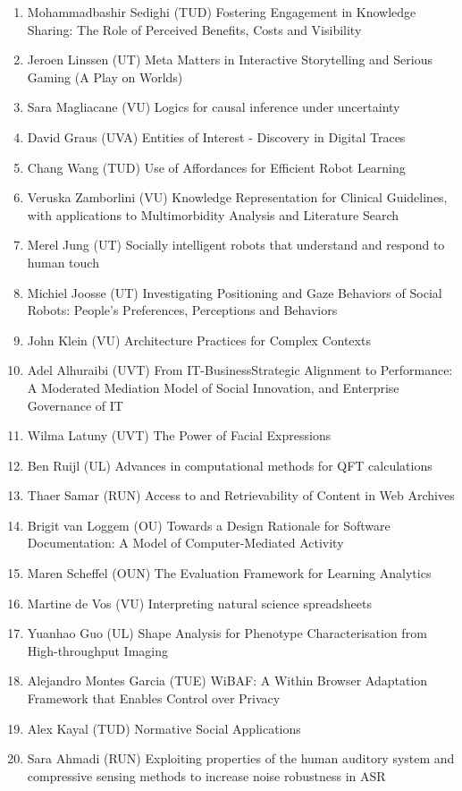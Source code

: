 \begin{multicols}{2}
\begin{scriptsize}
\begin{enumerate}[leftmargin=*,noitemsep,topsep=0pt,parsep=1pt,partopsep=0pt]
\item Mohammadbashir Sedighi (TUD) Fostering Engagement in Knowledge Sharing: The Role of Perceived Benefits, Costs and Visibility
\item Jeroen Linssen (UT) Meta Matters in Interactive Storytelling and Serious Gaming (A Play on Worlds)
\item Sara Magliacane (VU) Logics for causal inference under uncertainty 
\item David Graus (UVA) Entities of Interest - Discovery in Digital Traces
\item Chang Wang (TUD) Use of Affordances for Efficient Robot Learning
\item Veruska Zamborlini (VU) Knowledge Representation for Clinical Guidelines, with applications to Multimorbidity Analysis and Literature Search
\item Merel Jung (UT) Socially intelligent robots that understand and respond to human touch	
\item Michiel Joosse (UT) Investigating Positioning and Gaze Behaviors of Social Robots: People's Preferences, Perceptions and Behaviors
\item John Klein (VU) Architecture Practices for Complex Contexts
\item Adel Alhuraibi (UVT) From IT-BusinessStrategic Alignment to Performance: A Moderated Mediation Model of Social Innovation, and Enterprise Governance of IT
\item Wilma Latuny (UVT) The Power of Facial Expressions
\item Ben Ruijl (UL) Advances in computational methods for QFT calculations
\item Thaer Samar (RUN) Access to and Retrievability of Content in Web Archives
\item Brigit van Loggem (OU) Towards a Design Rationale for Software Documentation: A Model of Computer-Mediated Activity
\item Maren Scheffel (OUN) The Evaluation Framework for Learning Analytics
\item Martine de Vos (VU) Interpreting natural science spreadsheets
\item Yuanhao Guo (UL) Shape Analysis for Phenotype Characterisation from High-throughput Imaging
\item Alejandro Montes Garcia (TUE) WiBAF: A Within Browser Adaptation Framework that Enables Control over Privacy
\item Alex Kayal (TUD) Normative Social Applications
\item Sara Ahmadi (RUN) Exploiting properties of the human auditory system and compressive sensing methods to increase noise robustness in ASR

\end{enumerate}
\end{scriptsize}
\end{multicols}

